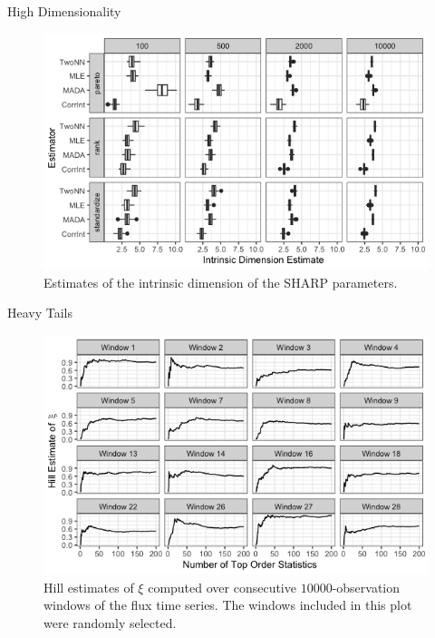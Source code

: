 \documentclass{beamer}
\begin{document}

\begin{frame}{High Dimensionality}
    \begin{figure}[!htb]
        \centering
        \includegraphics[scale=0.5]{intrinsic_dim_ests.png}
        \caption{Estimates of the intrinsic dimension of the SHARP parameters.}
        \label{fig:intrinsic_dim_ests}
    \end{figure}
\end{frame}

\begin{frame}{Heavy Tails}
    \begin{figure}[h!]
        \centering
        \includegraphics[scale=0.4]{hill_ests.png}
        \caption{Hill estimates of $\xi$ computed over consecutive $\num[group-separator={,}]{10000}$-observation windows of the flux time series. The windows included in this plot were randomly selected.}
        \label{fig:hill_ests}
    \end{figure}
\end{frame}
\end{document}
